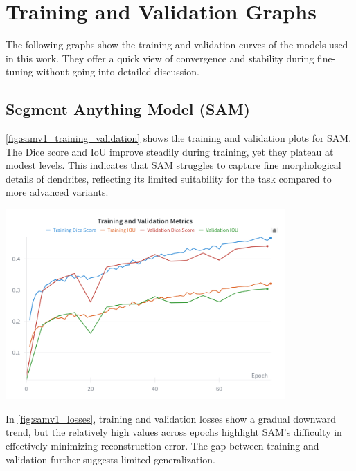 \section{Training and Validation Graphs}
\label{sec:training_validation_plots}
The following graphs show the training and validation curves of the models used in this work. They offer a quick view of convergence and stability during fine-tuning without going into detailed discussion.

\subsection{Segment Anything Model (SAM)}
\label{sec:sam_plots}

\autoref{fig:samv1_training_validation} shows the training and validation plots for SAM. The Dice score and IoU improve steadily during training, yet they plateau at modest levels. This indicates that SAM struggles to capture fine morphological details of dendrites, reflecting its limited suitability for the task compared to more advanced variants.

\begin{center}
\includegraphics[width=0.8\textwidth]{figures/48_samv1_metrics.png}
\label{fig:samv1_training_validation}
\end{center}

In \autoref{fig:samv1_losses}, training and validation losses show a gradual downward trend, but the relatively high values across epochs highlight SAM’s difficulty in effectively minimizing reconstruction error. The gap between training and validation further suggests limited generalization.

